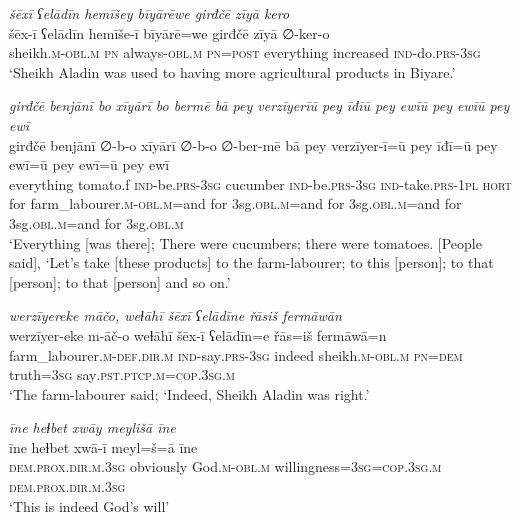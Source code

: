 \ea \label{PM.42}
\textit{šēxī ʕelādīn hemīšey bīyārēwe girđčē zīyā kero} \\ 
\gll šēx-ī ʕelādīn hemīše-ī bīyārē=we girđčē zīyā ∅-ker-o \\ 
 sheikh\textsc{.m}\textsc{-obl}\textsc{.m} \textsc{pn} always\textsc{-obl}\textsc{.m} \textsc{pn}\textsc{=\textsc{post}} everything increased \textsc{ind-}do\textsc{.prs}\textsc{-3sg} \\ 
\glt `Sheikh Aladin was used to having more agricultural products in Biyare.'
\z 
 
\ea \label{PM.43}
\textit{girđčē benjānī bo xīyārī bo bermē bā pey verzīyerīū pey īđīū pey ewīū pey ewīū pey ewī} \\ 
\gll girđčē benjānī ∅-b-o xīyārī ∅-b-o ∅-ber-mē bā pey verzīyer-ī=ū pey īđī=ū pey ewī=ū pey ewī=ū pey ewī \\ 
 everything tomato.f \textsc{ind-}be\textsc{.prs}\textsc{-3sg} cucumber \textsc{ind-}be\textsc{.prs}\textsc{-3sg} \textsc{ind-}take\textsc{.prs}\textsc{-1pl} \textsc{hort} for farm\_labourer\textsc{.m}\textsc{-obl}\textsc{.m}=and for 3sg\textsc{.obl}\textsc{.m}=and for 3sg\textsc{.obl}\textsc{.m}=and for 3sg\textsc{.obl}\textsc{.m}=and for 3sg\textsc{.obl}\textsc{.m} \\ 
\glt `Everything [was there]; There were cucumbers; there were tomatoes. [People said], ‘Let’s take [these products] to the farm-labourer; to this [person]; to that [person]; to that [person] and so on.'
\z 
 
\ea \label{PM.44}
\textit{werzīyereke māčo, weɫāhī šēxī ʕelādīne řāsiš fermāwān} \\ 
\gll werzīyer-eke m-āč-o weɫāhī šēx-ī ʕelādīn=e řās=iš fermāwā=n \\ 
 farm\_labourer\textsc{.m}\textsc{-def}\textsc{.dir}\textsc{.m} \textsc{ind-}say\textsc{.prs}\textsc{-3sg} indeed sheikh\textsc{.m}\textsc{-obl}\textsc{.m} \textsc{pn}\textsc{=dem} truth\textsc{=3sg} say\textsc{.pst}\textsc{.ptcp}\textsc{.m}\textsc{=cop}\textsc{.3sg}\textsc{.m} \\ 
\glt `The farm-labourer said; ‘Indeed, Sheikh Aladin was right.'
\z 
 
\ea \label{PM.51}
\textit{īne heɫbet xwāy meylišā īne} \\ 
\gll īne heɫbet xwā-ī meyl=š=ā īne \\ 
 \textsc{dem.prox}\textsc{.dir}\textsc{.m}\textsc{.3sg} obviously God\textsc{.m}\textsc{-obl}\textsc{.m} willingness\textsc{=3sg}\textsc{=cop}\textsc{.3sg}\textsc{.m} \textsc{dem.prox}\textsc{.dir}\textsc{.m}\textsc{.3sg} \\ 
\glt `This is indeed God’s will'
\z 
 
